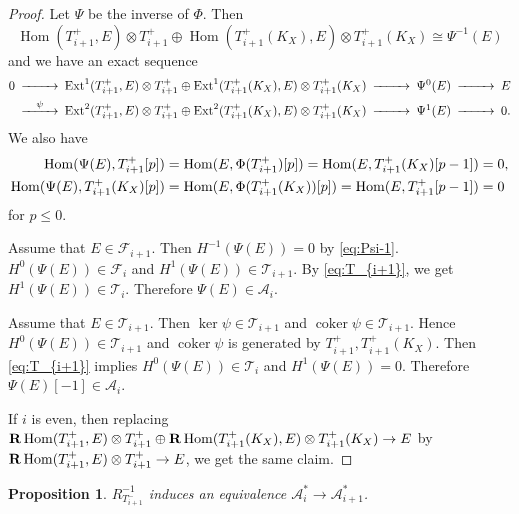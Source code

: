 \documentclass[leqno,11pt]{amsart}
\def\Ext{\mathop{\mathrm{Ext}}\nolimits}
\def\Hom{\mathop{\mathrm{Hom}}\nolimits}
\def\coker{\mathop{\mathrm{coker}}\nolimits}
\newtheorem{Prop}[Thm]{Proposition}
\theoremstyle{definition}
\def\AA{\ensuremath{\mathcal A}}
\def\FF{\ensuremath{\mathcal F}}
\def\TT{\ensuremath{\mathcal T}}
\begin{document}
\begin{proof}
Let $\Psi$ be the inverse of $\Phi$.
Then
\begin{equation}\label{eq:Psi-1}
\Hom(T_{i+1}^+,E) \otimes T_{i+1}^+ \oplus
\Hom(T_{i+1}^+(K_X),E) \otimes T_{i+1}^+(K_X) \cong \Psi^{-1}(E)
\end{equation}
and we have an exact sequence
\begin{equation}
\begin{CD}
0 @>>> \Ext^1(T_{i+1}^+,E) \otimes T_{i+1}^+ \oplus
\Ext^1(T_{i+1}^+(K_X),E) \otimes T_{i+1}^+(K_X) @>>> \Psi^0(E) @>>>E \\
 @>{\psi}>> \Ext^2(T_{i+1}^+,E) \otimes T_{i+1}^+ \oplus
\Ext^2(T_{i+1}^+(K_X),E) \otimes T_{i+1}^+(K_X) @>>> \Psi^1(E) @>>>0.
\end{CD}
\end{equation}
We also have
\begin{equation}\label{eq:T_{i+1}}
\begin{split}
\Hom(\Psi(E),T_{i+1}^+[p])& =\Hom(E,\Phi(T_{i+1}^+)[p])=
\Hom(E, T_{i+1}^+(K_X)[p-1])=0,\\
\Hom(\Psi(E),T_{i+1}^+(K_X)[p])& =\Hom(E,\Phi(T_{i+1}^+(K_X))[p])=
\Hom(E, T_{i+1}^+[p-1])=0
\end{split}
\end{equation}
for $p \leq 0$.



Assume that 
$E \in \FF_{i+1}$.
Then $H^{-1}(\Psi(E))=0$ by \eqref{eq:Psi-1}.
$H^0(\Psi(E)) \in \FF_{i}$ and $H^1(\Psi(E)) \in \TT_{i+1}$.
By \eqref{eq:T_{i+1}}, we get
$H^1(\Psi(E)) \in \TT_i$.
Therefore $\Psi(E) \in \AA_i$.

Assume that $E \in \TT_{i+1}$.
Then $\ker \psi \in \TT_{i+1}$ and
$\coker \psi \in \TT_{i+1}$.
Hence $H^0(\Psi(E)) \in \TT_{i+1}$ and
$\coker \psi$ is generated by $T_{i+1}^+,T_{i+1}^+(K_X)$.
Then \eqref{eq:T_{i+1}} implies 
$H^0(\Psi(E)) \in \TT_i$ and
$H^1(\Psi(E))=0$.
Therefore $\Psi(E)[-1] \in \AA_i$.

If $i$ is even, then
replacing 
${\bf R}\Hom(T_{i+1}^+,E) \otimes T_{i+1}^+
\oplus {\bf R}\Hom(T_{i+1}^+ (K_X),E) \otimes T_{i+1}^+ (K_X)
\to E$ by
${\bf R}\Hom(T_{i+1}^+,E) \otimes T_{i+1}^+
\to E$, 
we get the same claim.
\end{proof}






\begin{Prop}\label{Prop:equiv2-2}
$R_{T_{i+1}^-}^{-1}$ induces an equivalence
$\AA_i^* \to \AA_{i+1}^*$.
\end{Prop}
\end{document}
